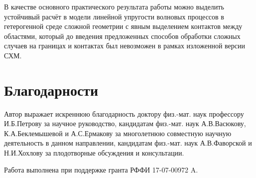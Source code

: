 \documentclass[a4paper]{article}
\numberwithin{equation}{section}
\begin{document}
В качестве основного практического результата работы можно выделить 
устойчивый расчёт в модели линейной упругости 
волновых процессов в гетерогенной среде сложной 
геометрии с явным выделением контактов между областями, который 
до введения предложенных способов обработки сложных случаев на 
границах и контактах был невозможен в рамках изложенной версии СХМ. 


\section{Благодарности}
Автор выражает искреннюю благодарность доктору физ.-мат. наук профессору И.Б.Петрову за научное руководство,
кандидатам физ.-мат. наук А.В.Васюкову, К.А.Беклемышевой и А.С.Ермакову за многолетнюю совместную научную деятельность в данном направлении,
кандидатам физ.-мат. наук А.В.Фаворской и Н.И.Хохлову за плодотворные обсуждения и консультации.

Работа выполнена при поддержке гранта РФФИ 17-07-00972 A.
\end{document}
